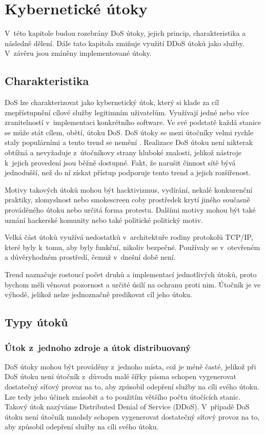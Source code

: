 \chapter[DoS útoky]{Kybernetické útoky}
V~této kapitole budou rozebrány DoS útoky, jejich princip, charakteristika a následně
dělení. Dále tato kapitola zmiňuje využití DDoS útoků jako služby. V~závěru jsou
zmíněny implementované útoky.

\section{Charakteristika}
DoS lze charakterizovat jako kybernetický útok, který si klade za cíl znepřístupnění
 cílové služby legitimním uživatelům. Využívají jedné nebo více zranitelností v~implementaci
 konkrétního software. Ve své podstatě každá stanice se může stát cílem, obětí, útoku
 DoS. DoS útoky se mezi útočníky velmi rychle staly populárními a tento trend
 se nemění \cite{akamai_q2_2017}. Realizace DoS útoku není nikterak obtížná a
 nevyžaduje z~útočníkovy strany hluboké znalosti, jelikož nástroje k~jejich provedení jsou
 běžně dostupné. %
 Fakt, že narušit činnost sítě bývá
 jednodušší, než do ní získat přístup podporuje tento trend a jejich rozšířenost. 

Motivy takových útoků mohou být hacktivizmus, vydírání, nekalé konkurenční praktiky,
zlomyslnost nebo smokescreen coby prostředek krytí jiného současně prováděného útoku nebo
určitá forma protestu. Dalšími motivy mohou být také uznání hackerské komunity nebo také
politické politický motiv.

Velká část útoků využívá nedostatků v~architektuře rodiny protokolů TCP/IP, které byly k~tomu,
aby byly funkční, nikoliv bezpečné. Používaly se v~otevřeném a důvěryhodném prostředí, čemuž
v~dnešní době není.

Trend naznačuje rostoucí počet druhů a implementací jednotlivých útoků, proto bychom měli
věnovat pozornost a určité úsilí na ochranu proti nim. Útočník je ve výhodě, jelikož nelze
jednoznačně predikovat cíl jeho útoku.


\section{Typy útoků}
\subsection{Útok z~jednoho zdroje a útok distribuovaný}
\label{subs_ddos}
DoS útoky mohou být prováděny z~jednoho místa, což je méně časté, jelikož při
DoS útoku není útočník z~důvodu malé šířky pásma schopen vygenerovat dostatečný síťový
provoz na to, aby způsobil odepření služby na cíli svého útoku. Lze tedy jeho účinek znásobit a
to použitím většího počtu útočících stanic. Takový útok nazýváme Distributed Denial of Service (DDoS). V~případě
DoS útoku není útočník mnohdy schopen vygenerovat dostatečný síťový provoz na to, aby
způsobil odepření služby na cíli svého útoku.

